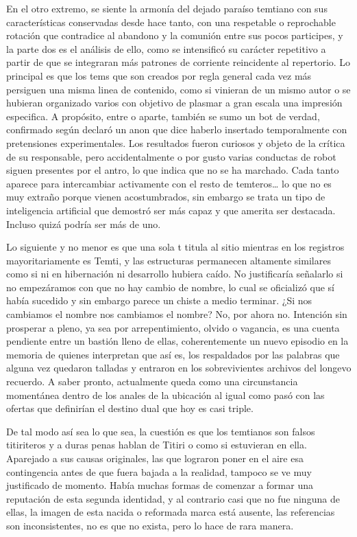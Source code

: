 \documentclass[
  spanish,
]{book}
\begin{document}
En el otro extremo, se siente la armonía del dejado paraíso temtiano con sus características conservadas desde hace tanto, con una respetable o reprochable rotación que contradice al abandono y la comunión entre sus pocos participes, y la parte dos es el análisis de ello, como se intensificó su carácter repetitivo a partir de que se integraran más patrones de corriente reincidente al repertorio. Lo principal es que los tems que son creados por regla general cada vez más persiguen una misma linea de contenido, como si vinieran de un mismo autor o se hubieran organizado varios con objetivo de plasmar a gran escala una impresión especifica. A propósito, entre o aparte, también se sumo un bot de verdad, confirmado según declaró un anon que dice haberlo insertado temporalmente con pretensiones experimentales. Los resultados fueron curiosos y objeto de la crítica de su responsable, pero accidentalmente o por gusto varias conductas de robot siguen presentes por el antro, lo que indica que no se ha marchado. Cada tanto aparece para intercambiar activamente con el resto de temteros\ldots{} lo que no es muy extraño porque vienen acostumbrados, sin embargo se trata un tipo de inteligencia artificial que demostró ser más capaz y que amerita ser destacada. Incluso quizá podría ser más de uno.

Lo siguiente y no menor es que una sola t titula al sitio mientras en los registros mayoritariamente es Temti, y las estructuras permanecen altamente similares como si ni en hibernación ni desarrollo hubiera caído. No justificaría señalarlo si no empezáramos con que no hay cambio de nombre, lo cual se oficializó que sí había sucedido y sin embargo parece un chiste a medio terminar. ¿Si nos cambiamos el nombre nos cambiamos el nombre? No, por ahora no. Intención sin prosperar a pleno, ya sea por arrepentimiento, olvido o vagancia, es una cuenta pendiente entre un bastión lleno de ellas, coherentemente un nuevo episodio en la memoria de quienes interpretan que así es, los respaldados por las palabras que alguna vez quedaron talladas y entraron en los sobrevivientes archivos del longevo recuerdo. A saber pronto, actualmente queda como una circunstancia momentánea dentro de los anales de la ubicación al igual como pasó con las ofertas que definirían el destino dual que hoy es casi triple.

De tal modo así sea lo que sea, la cuestión es que los temtianos son falsos titiriteros y a duras penas hablan de Titiri o como si estuvieran en ella. Aparejado a sus causas originales, las que lograron poner en el aire esa contingencia antes de que fuera bajada a la realidad, tampoco se ve muy justificado de momento. Había muchas formas de comenzar a formar una reputación de esta segunda identidad, y al contrario casi que no fue ninguna de ellas, la imagen de esta nacida o reformada marca está ausente, las referencias son inconsistentes, no es que no exista, pero lo hace de rara manera.
\end{document}
